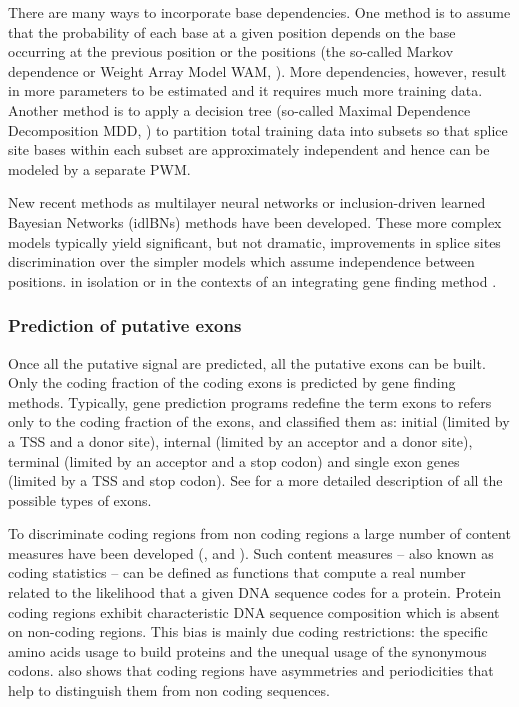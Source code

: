 There are many ways to incorporate base dependencies. One method is to
assume that the probability of each base at a given position depends
on the base occurring at the previous position or the positions (the
so-called Markov dependence or Weight Array Model WAM,
\cite{zhang:1993a}). More dependencies, however, result in more
parameters to be estimated and it requires much more training
data. Another method is to apply a decision tree (so-called Maximal
Dependence Decomposition MDD, \cite{burge:1997a}) to partition total
training data into subsets so that splice site bases within each
subset are approximately independent and hence can be modeled by a
separate PWM.

New recent methods as multilayer neural networks \citep{reese:1997a}
or inclusion-driven learned Bayesian Networks (idlBNs)
\citep{castelo:2004a} methods have been developed. These more complex
models typically yield significant, but not dramatic, improvements in
splice sites discrimination over the simpler models which assume
independence between positions. in isolation or in the contexts of an
integrating gene finding method \citep{burge:1998a}.

\subsubsection{Prediction of putative exons}

Once all the putative signal are predicted, all the putative exons can
be built. Only the coding fraction of the coding exons is predicted by
gene finding methods. Typically, gene prediction programs redefine the
term exons to refers only to the coding fraction of the exons, and
classified them as: initial (limited by a TSS and a donor site),
internal (limited by an acceptor and a donor site), terminal (limited
by an acceptor and a stop codon) and single exon genes (limited by a
TSS and stop codon). See \cite{zhang:2002a} for a more detailed
description of all the possible types of exons.

To discriminate coding regions from non coding regions a large number
of content measures have been developed (\cite{fickett:1992a},
\cite{gelfand:1995a} and \cite{guigo:1999a}). Such content measures --
also known as coding statistics -- can be defined as functions that
compute a real number related to the likelihood that a given DNA
sequence codes for a protein. Protein coding regions exhibit
characteristic DNA sequence composition which is absent on non-coding
regions. This bias is mainly due coding restrictions: the specific amino
acids usage to build proteins and the unequal usage of the
synonymous codons.  \cite{fickett:1982a} also shows that coding
regions have asymmetries and periodicities that help to distinguish
them from non coding sequences.

